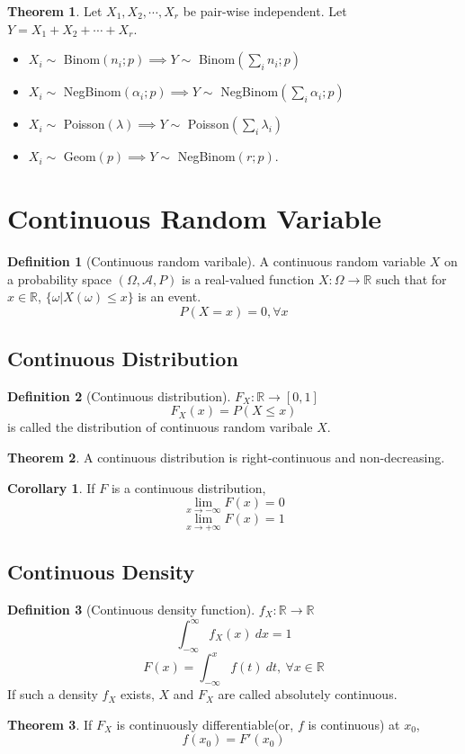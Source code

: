 \documentclass[10pt, a4paper]{extarticle}
\theoremstyle{definition}
\newtheorem{thm}{Theorem}
\newtheorem{cor}{Corollary}[thm]
\newtheorem{defn}{Definition}
\begin{document}
	\begin{thm}
		Let $X_1,X_2,\cdots,X_r$ be pair-wise independent. Let $Y=X_1+X_2+\cdots+X_r$.
		\begin{itemize}
			\item $X_i\sim$ Binom$(n_i;p)\implies Y\sim$ Binom$(\sum_i n_i;p)$
			\item $X_i\sim$ NegBinom$(\alpha_i;p)\implies Y\sim$ NegBinom$(\sum_i\alpha_i;p)$
			\item $X_i\sim$ Poisson$(\lambda)\implies Y\sim$ Poisson$(\sum_i\lambda_i)$
			\item $X_i\sim$ Geom$(p)\implies Y\sim$ NegBinom$(r;p)$.
		\end{itemize}
	\end{thm}

	\section{Continuous Random Variable}
	\begin{defn}[Continuous random varibale]
		A continuous random variable $X$ on a probability space $(\Omega,\mathscr{A},P)$ is a real-valued function $X:\Omega\to\mathbb{R}$ such that for $x\in\mathbb{R}$, $\{\omega|X(\omega)\leq x\}$ is an event.
		\[P(X=x)=0,\forall x\]
	\end{defn}
	\subsection{Continuous Distribution}
	\begin{defn}[Continuous distribution]
		$F_X:\mathbb{R}\to[0,1]$
		\[F_X(x)=P(X\leq x)\]
		is called the distribution of continuous random varibale $X$.
	\end{defn}
	\begin{thm}
		A continuous distribution is right-continuous and non-decreasing.
	\end{thm}
	\begin{cor}
		If $F$ is a continuous distribution,
		\[\lim_{x\to{-\infty}}F(x)=0\]
		\[\lim_{x\to{+\infty}}F(x)=1\]
	\end{cor}
	\subsection{Continuous Density}
	\begin{defn}[Continuous density function]
		$f_X:\mathbb{R}\to\mathbb{R}$
		\[\int_{-\infty}^\infty f_X(x)\ dx=1\]
		\[F(x)=\int_{-\infty}^x f(t)\ dt,\ \forall x\in\mathbb{R}\]
		If such a density $f_X$ exists, $X$ and $F_X$ are called absolutely continuous.
	\end{defn}
	\begin{thm}
		If $F_X$ is continuously differentiable(or, $f$ is continuous) at $x_0$,
		\[f(x_0)=F'(x_0)\]
	\end{thm}
	
\end{document}
